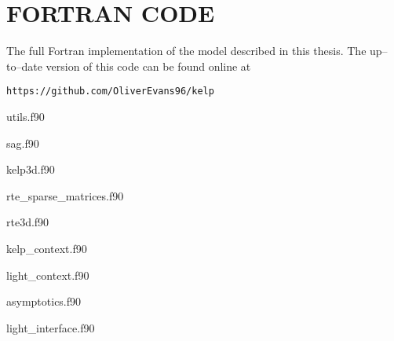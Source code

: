 \chapter{FORTRAN CODE}
\label{chap:fortran}

The full Fortran implementation of the model described in this thesis.
The up--to--date version of this code can be found online at
\begin{verbatim}
https://github.com/OliverEvans96/kelp
\end{verbatim}

utils.f90


sag.f90


kelp3d.f90


rte\_sparse\_matrices.f90


rte3d.f90


kelp\_context.f90


light\_context.f90


asymptotics.f90


light\_interface.f90


